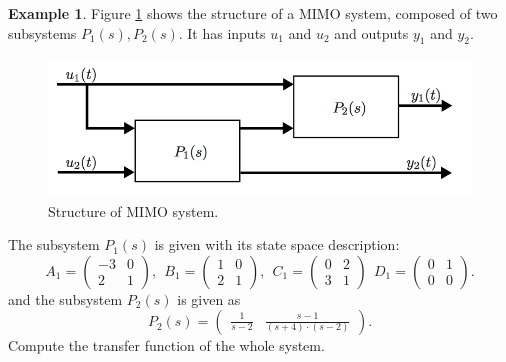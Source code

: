 \documentclass[a4paper,12 pt]{article}
\numberwithin{equation}{section}
\theoremstyle{definition}
\newtheorem{bsp}{Example}
\theoremstyle{remark}
\theoremstyle{definition}
\theoremstyle{definition}
\theoremstyle{definition}
\theoremstyle{remark}
\begin{document}
\newpage
\begin{bsp}
Figure \ref{fig:rgatransfers} shows the structure of a MIMO system, composed of two subsystems $P_1(s),P_2(s)$. It has inputs $u_1$ and $u_2$ and outputs $y_1$ and $y_2$.
\begin{figure}[ht]
\begin{center}
\includegraphics[width=0.65\columnwidth]{rgatransfers}
\caption{Structure of MIMO system.}
\label{fig:rgatransfers}
\end{center}
\end{figure}
The subsystem $P_1(s)$ is given with its state space description:
\begin{equation*}
A_1=\begin{pmatrix}
-3&0\\
2&1
\end{pmatrix}, \ \ B_1=\begin{pmatrix}
1&0\\
2&1
\end{pmatrix}, \ \ C_1=\begin{pmatrix}
0&2\\
3&1
\end{pmatrix}\ \ 
D_1=\begin{pmatrix}
0&1\\
0&0
\end{pmatrix}.
\end{equation*}
and the subsystem $P_2(s)$ is given as
\begin{equation*}
P_2(s)=\begin{pmatrix}
\frac{1}{s-2}&\frac{s-1}{(s+4)\cdot (s-2)}
\end{pmatrix}.
\end{equation*}
Compute the transfer function of the whole system.
\newpage


\end{bsp}
\end{document}

